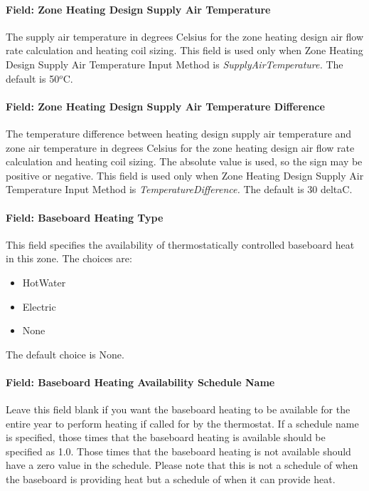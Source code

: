 \paragraph{Field: Zone Heating Design Supply Air Temperature}\label{field-zone-heating-design-supply-air-temperature-3}

The supply air temperature in degrees Celsius for the zone heating design air flow rate calculation and heating coil sizing. This field is used only when Zone Heating Design Supply Air Temperature Input Method is \emph{SupplyAirTemperature.} The default is 50\(^{o}\)C.

\paragraph{Field: Zone Heating Design Supply Air Temperature Difference}\label{field-zone-heating-design-supply-air-temperature-difference-4}

The temperature difference between heating design supply air temperature and zone air temperature in degrees Celsius for the zone heating design air flow rate calculation and heating coil sizing. The absolute value is used, so the sign may be positive or negative. This field is used only when Zone Heating Design Supply Air Temperature Input Method is \emph{TemperatureDifference.} The default is 30 deltaC.

\paragraph{Field: Baseboard Heating Type}\label{field-baseboard-heating-type-5}

This field specifies the availability of thermostatically controlled baseboard heat in this zone. The choices are:

\begin{itemize}
\item
  HotWater
\item
  Electric
\item
  None
\end{itemize}

The default choice is None.

\paragraph{Field: Baseboard Heating Availability Schedule Name}\label{field-baseboard-heating-availability-schedule-name-5}

Leave this field blank if you want the baseboard heating to be available for the entire year to perform heating if called for by the thermostat. If a schedule name is specified, those times that the baseboard heating is available should be specified as 1.0. Those times that the baseboard heating is not available should have a zero value in the schedule. Please note that this is not a schedule of when the baseboard is providing heat but a schedule of when it can provide heat.

